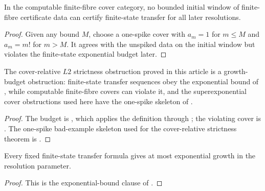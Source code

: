 \begin{proposition}
\label{prop:finite-prefix-no-transfer-certification}
In the computable finite-fibre cover category, no bounded initial window of
finite-fibre certificate data can certify finite-state transfer for all later
resolutions.
\end{proposition}

\begin{proof}
Given any bound \(M\), choose a one-spike cover with \(a_m=1\) for
\(m\le M\) and \(a_m=m!\) for \(m>M\).  It agrees with the unspiked data on the
initial window but violates the finite-state exponential budget later.
\end{proof}

\begin{theorem}
\label{thm:L2-budget-spine}
The cover-relative \(L2\) strictness obstruction proved in this article is a
growth-budget obstruction: finite-state transfer sequences obey the exponential
bound of , while computable
finite-fibre covers can violate it, and the superexponential cover obstructions
used here have the one-spike skeleton of
.
\end{theorem}

\begin{proof}
The budget is , which applies the
definition  through
; the violating cover is
.  The one-spike bad-example skeleton used for
the cover-relative strictness theorem is .
\end{proof}

\begin{corollary}
\label{cor:finite-state-growth-budget}
Every fixed finite-state transfer formula gives at most exponential growth in
the resolution parameter.
\end{corollary}

\begin{proof}
This is the exponential-bound clause of
.
\end{proof}




